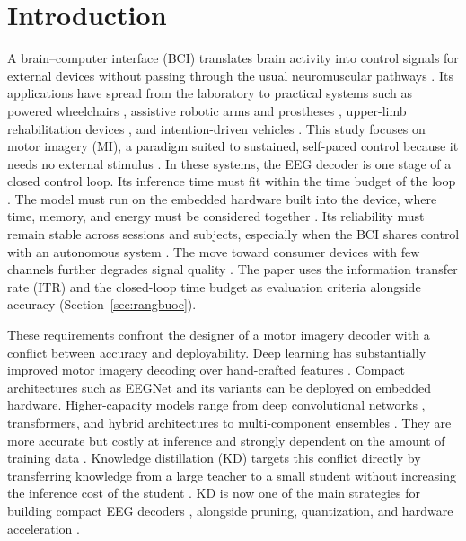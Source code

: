 \section{Introduction}
\label{sec:gioithieu}

A brain--computer interface (BCI) translates brain activity into control
signals for external devices without passing through the usual
neuromuscular pathways \cite{chen2025brain, tonin2021noninvasive,
ding2026brain}. Its applications have spread from the laboratory to
practical systems \cite{varbu2022present, pang2024applications} such as
powered wheelchairs \cite{palumbo2021motorimagery, lei2022intention,
mai2024hybrid}, assistive robotic arms and prostheses \cite{casey2021bci},
upper-limb rehabilitation devices \cite{baniqued2021brain}, and
intention-driven vehicles \cite{lu2020model}. This study focuses on motor
imagery (MI), a paradigm suited to sustained, self-paced control because
it needs no external stimulus \cite{palumbo2021motorimagery}. In these
systems, the EEG decoder is one stage of a closed control loop. Its
inference time must fit within the time budget of the loop
\cite{an2024development, tonin2020role}. The model must run on the
embedded hardware built into the device, where time, memory, and energy
must be considered together \cite{sun2025signal, akbari2025atrial,
craighero2024ondevice, wang2024mibminet, pacini2024design,
sen2025lowlatency}. Its reliability must remain
stable across sessions and subjects, especially when the BCI shares
control with an autonomous system \cite{choi2023asynchronous,
deng2020selfadaptive, wei2023intra}. The move toward consumer devices with
few channels further degrades signal quality \cite{wu2022deepbrain,
tarara2025motor, paneru2025eeg}. The paper uses the information transfer
rate (ITR) \cite{wolpaw2002brain} and the closed-loop time budget as
evaluation criteria alongside accuracy (Section~\ref{sec:rangbuoc}).

These requirements confront the designer of a motor imagery decoder with a conflict between accuracy and deployability. Deep learning
has substantially improved motor imagery decoding over hand-crafted
features \cite{al-saegh2021deep, sadiq2021development}. Compact
architectures such as EEGNet \cite{lawhern2018eegnet} and its variants
\cite{ingolfsson2020eegtcnet, deng2021advanced, wang2022mieeg,
wang2023ifnet} can be deployed on embedded hardware. Higher-capacity models range from deep convolutional networks
\cite{schirrmeister2017deep}, transformers, and hybrid architectures
\cite{vafaei2025transformers, zhao2024ctnet, ding2025eegdeformer,
altaheri2025temporal, wang20232d} to multi-component ensembles
\cite{zoumpourlis2024motor}. They are more accurate but costly at inference
and strongly dependent on the amount of training data
\cite{keutayeva2024data, keutayeva2024compact}. Knowledge distillation
(KD) targets this conflict directly by transferring knowledge from a large
teacher to a small student without increasing the inference cost of the
student \cite{hinton2015distilling}. KD is now one of the main strategies
for building compact EEG decoders \cite{li2025lightweight,
zhou2026structural}, alongside pruning, quantization, and hardware
acceleration \cite{xie2024comprehensive}.

